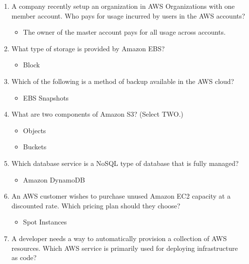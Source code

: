\begin{enumerate}
	\item A company recently setup an organization in AWS Organizations with one member account. Who pays for usage incurred by users in the AWS accounts?

	\begin{itemize}
	\item The owner of the master account pays for all usage across accounts.
\end{itemize}

	\item What type of storage is provided by Amazon EBS?

	\begin{itemize}
	\item Block
\end{itemize}

	\item Which of the following is a method of backup available in the AWS cloud?

	\begin{itemize}
	\item EBS Snapshots
\end{itemize}

	\item What are two components of Amazon S3? (Select TWO.)

	\begin{itemize}
	\item Objects
	\item Buckets
\end{itemize}

	\item Which database service is a NoSQL type of database that is fully managed?

	\begin{itemize}
	\item Amazon DynamoDB
\end{itemize}

	\item An AWS customer wishes to purchase unused Amazon EC2 capacity at a discounted rate. Which pricing plan should they choose?

	\begin{itemize}
	\item Spot Instances
\end{itemize}

	\item A developer needs a way to automatically provision a collection of AWS resources. Which AWS service is primarily used for deploying infrastructure as code?


\end{enumerate}
